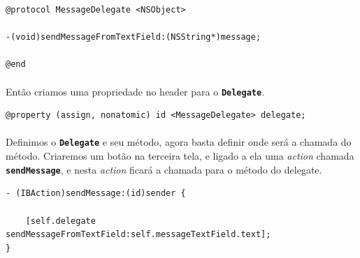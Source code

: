 \documentclass[a4paper,12pt,brazil,doubleside]{book}
\begin{document}
\begin{listing}
\begin{verbatim}
@protocol MessageDelegate <NSObject>

-(void)sendMessageFromTextField:(NSString*)message;

@end
\end{verbatim}
\end{listing}

\paragraph{}Então criamos uma propriedade no header para o \texttt{\textbf{Delegate}}.

\bigskip

\begin{listing}
\begin{verbatim}
@property (assign, nonatomic) id <MessageDelegate> delegate;
\end{verbatim}
\end{listing}

\paragraph{}Definimos o \texttt{\textbf{Delegate}} e seu método, agora basta definir onde será a chamada do método. Criaremos um botão na terceira tela, e ligado a ela uma \emph{action} chamada \texttt{\textbf{sendMessage}}, e nesta \emph{action} ficará a chamada para o método do delegate.

\begin{listing}
\begin{verbatim}
- (IBAction)sendMessage:(id)sender {
    
    [self.delegate sendMessageFromTextField:self.messageTextField.text];
}
\end{verbatim}
\end{listing}
\end{document}

